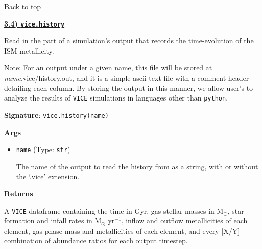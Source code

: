 \documentclass{report}
\begin{document}
\vfill 
\hyperlink{top}{Back to top} 
\clearpage 

\newpage
\noindent 
\begin{center}
\hypertarget{func:history}{
	\underline{\LARGE 
		\textbf{3.4) \texttt{vice.history}}
	}
}
\end{center}
\par\noindent 
Read in the part of a simulation's output that records the time-evolution of 
the ISM metallicity. 
\par\noindent 
Note: For an output under a given name, this file will be stored at 
\textit{name}.vice/history.out, and it is a simple ascii text file with a 
comment header detailing each column. By storing the output in this manner, 
we allow user's to analyze the results of \texttt{VICE} simulations in 
languages other than \texttt{python}. 

\par\null\par\noindent 
\textbf{Signature}: \texttt{vice.history(name)} 

\par\null\par\noindent 
\underline{\textbf{Args}}
\begin{itemize} 
	\item{
		\texttt{name} (Type: \texttt{str}) 
		\par
		The name of the output to read the history from as a string, with or 
		without the `.vice' extension. 
	}
\end{itemize}

\par\null\par\noindent 
\underline{\textbf{Returns}} 
\par\noindent 
A \texttt{VICE} dataframe containing the time in Gyr, gas stellar masses in 
M$_\odot$, star formation and infall rates in M$_\odot$ yr$^{-1}$, inflow and 
outflow metallicities of each element, gas-phase mass and metallicities of 
each element, and every [X/Y] combination of abundance ratios for each output 
timestep. 
\end{document}
